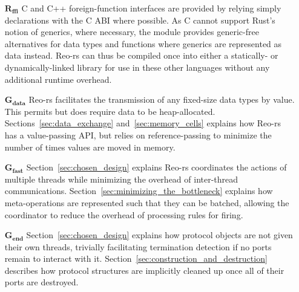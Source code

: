\begin{enumerate}
	\item[$\boldsymbol{R_{ffi}}$] C and C++ foreign-function interfaces are provided by relying simply declarations with the C ABI where possible. As C cannot support Rust's notion of generics, where necessary, the  module provides generic-free alternatives for data types and functions where generics are represented as data instead. Reo-rs can thus be compiled once into either a statically- or dynamically-linked library for use in these other languages without any additional runtime overhead.
	
	\item[$\boldsymbol{G_{data}}$] Reo-rs facilitates the transmission of any fixed-size data types by value. This permits but does require data to be heap-allocated. Sections~\ref{sec:data_exchange} and~\ref{sec:memory_cells} explains how Reo-rs has a value-passing API, but relies on reference-passing to minimize the number of times values are moved in memory.
	
	\item[$\boldsymbol{G_{fast}}$] Section~\ref{sec:chosen_design} explains Reo-rs coordinates the actions of multiple threads while minimizing the overhead of inter-thread communications. Section~\ref{sec:minimizing_the_bottleneck} explains how meta-operations are represented such that they can be batched, allowing the coordinator to reduce the overhead of processing rules for firing.
	
	\item[$\boldsymbol{G_{end}}$] Section~\ref{sec:chosen_design} explains how protocol objects are not given their own threads, trivially facilitating termination detection if no ports remain to interact with it. Section~\ref{sec:construction_and_destruction} describes how protocol structures are implicitly cleaned up once all of their ports are destroyed. 
\end{enumerate}